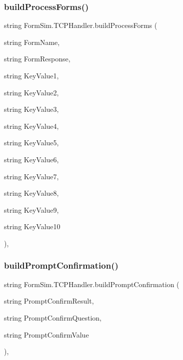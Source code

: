 \mbox{\label{class_form_sim_1_1_t_c_p_handler_ad2df13eccffc001256e4a0265ef274c6}} 
\subsubsection{\texorpdfstring{build\+Process\+Forms()}{buildProcessForms()}}
{\footnotesize\ttfamily string Form\+Sim.\+T\+C\+P\+Handler.\+build\+Process\+Forms (\begin{DoxyParamCaption}\item[{string}]{Form\+Name,  }\item[{string}]{Form\+Response,  }\item[{string}]{Key\+Value1,  }\item[{string}]{Key\+Value2,  }\item[{string}]{Key\+Value3,  }\item[{string}]{Key\+Value4,  }\item[{string}]{Key\+Value5,  }\item[{string}]{Key\+Value6,  }\item[{string}]{Key\+Value7,  }\item[{string}]{Key\+Value8,  }\item[{string}]{Key\+Value9,  }\item[{string}]{Key\+Value10 }\end{DoxyParamCaption})\hspace{0.3cm}{\ttfamily [inline]}, {\ttfamily [private]}}

\mbox{\label{class_form_sim_1_1_t_c_p_handler_a37aa7ecd052c79a26fdac447ea6a72d4}} 
\subsubsection{\texorpdfstring{build\+Prompt\+Confirmation()}{buildPromptConfirmation()}}
{\footnotesize\ttfamily string Form\+Sim.\+T\+C\+P\+Handler.\+build\+Prompt\+Confirmation (\begin{DoxyParamCaption}\item[{string}]{Prompt\+Confirm\+Result,  }\item[{string}]{Prompt\+Confirm\+Question,  }\item[{string}]{Prompt\+Confirm\+Value }\end{DoxyParamCaption})\hspace{0.3cm}{\ttfamily [inline]}, {\ttfamily [private]}}

